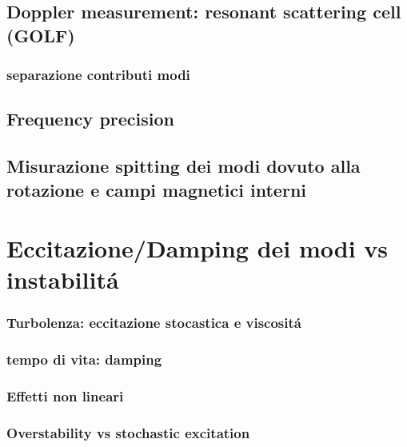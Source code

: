 \documentclass[../main.tex]{subfiles}
\begin{document}
\section{Doppler measurement: resonant scattering cell (GOLF)}

\subsection{separazione contributi modi}

\section{Frequency precision}

\section{Misurazione spitting dei modi dovuto alla rotazione e campi magnetici interni}

\begin{refsection}

\nocite{*}
\printbibliography
\end{refsection}
\printbibliography[keyword={rotation}]

\chapter{Eccitazione/Damping dei modi vs instabilit\'a}

\subsection{Turbolenza: eccitazione stocastica e viscosit\'a}

\subsection{tempo di vita: damping}

\subsection{Effetti non lineari}

\subsection{Overstability vs stochastic excitation}
\end{document}
